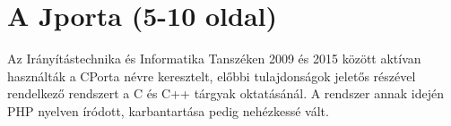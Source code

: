 \chapter{A Jporta (5-10 oldal)}\label{chapter:jporta}

Az Irányítástechnika és Informatika Tanszéken 2009 és 2015 között aktívan használták a CPorta névre keresztelt, előbbi tulajdonságok jeletős részével rendelkező rendszert \cite{KalmanMsc} a C és C++ tárgyak oktatásánál. A rendszer annak idején PHP nyelven íródott, karbantartása pedig nehézkessé vált. 